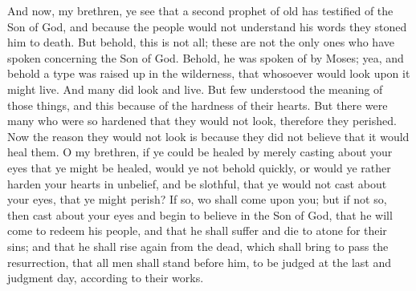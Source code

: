 And now, my brethren, ye see that a second prophet of old has testified of the Son of God, and because the people would not understand his words they stoned him to death.
\bverse \iffalse But behold, this is not all; these are not the only ones who have spoken concerning the Son of God. \fi
But behold, this is not all; these are not the only ones who have spoken concerning the Son of God.
\bverse \iffalse Behold, he was spoken of by Moses; yea, and behold a type was raised up in the wilderness, that whosoever would look upon it might live. And many did look and live. \fi
Behold, he was spoken of by Moses; yea, and behold a type was raised up in the wilderness, that whosoever would look upon it might live. And many did look and live.
\bverse \iffalse But few understood the meaning of those things, and this because of the hardness of their hearts. But there were many who were so hardened that they would not look, therefore they perished. Now the reason they would not look is because they did not believe that it would heal them. \fi
But few understood the meaning of those things, and this because of the hardness of their hearts. But there were many who were so hardened that they would not look, therefore they perished. Now the reason they would not look is because they did not believe that it would heal them.
\bverse \iffalse O my brethren, if ye could be healed by merely casting about your eyes that ye might be healed, would ye not behold quickly, or would ye rather harden your hearts in unbelief, and be slothful, that ye would not cast about your eyes, that ye might perish? \fi
O my brethren, if ye could be healed by merely casting about your eyes that ye might be healed, would ye not behold quickly, or would ye rather harden your hearts in unbelief, and be slothful, that ye would not cast about your eyes, that ye might perish?
\bverse \iffalse If so, wo shall come upon you; but if not so, then cast about your eyes and begin to believe in the Son of God, that he will come to redeem his people, and that he shall suffer and die to atone for their sins; and that he shall rise again from the dead, which shall bring to pass the resurrection, that all men shall stand before him, to be judged at the last and judgment day, according to their works. \fi
If so, wo shall come upon you; but if not so, then cast about your eyes and begin to believe in the Son of God, that he will come to redeem his people, and that he shall suffer and die to atone for their sins; and that he shall rise again from the dead, which shall bring to pass the resurrection, that all men shall stand before him, to be judged at the last and judgment day, according to their works.
